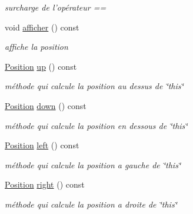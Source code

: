 \begin{DoxyCompactItemize}
\begin{DoxyCompactList}\small\item\em surcharge de l'opérateur == \end{DoxyCompactList}\item 
\hypertarget{classPosition_a93014db59c98c0f95eb2056bf546f956}{void \hyperlink{classPosition_a93014db59c98c0f95eb2056bf546f956}{afficher} () const }\label{classPosition_a93014db59c98c0f95eb2056bf546f956}

\begin{DoxyCompactList}\small\item\em affiche la position \end{DoxyCompactList}\item 
\hypertarget{classPosition_a429c01611d2b0d7dfb06d182ad60928c}{\hyperlink{classPosition}{Position} \hyperlink{classPosition_a429c01611d2b0d7dfb06d182ad60928c}{up} () const }\label{classPosition_a429c01611d2b0d7dfb06d182ad60928c}

\begin{DoxyCompactList}\small\item\em méthode qui calcule la position au dessus de \char`\"{}this\char`\"{} \end{DoxyCompactList}\item 
\hypertarget{classPosition_a20fbdadf072a7f285e8181f339776c0c}{\hyperlink{classPosition}{Position} \hyperlink{classPosition_a20fbdadf072a7f285e8181f339776c0c}{down} () const }\label{classPosition_a20fbdadf072a7f285e8181f339776c0c}

\begin{DoxyCompactList}\small\item\em méthode qui calcule la position en dessous de \char`\"{}this\char`\"{} \end{DoxyCompactList}\item 
\hypertarget{classPosition_ad90cc325cca474c6c140b63c9bc69ddd}{\hyperlink{classPosition}{Position} \hyperlink{classPosition_ad90cc325cca474c6c140b63c9bc69ddd}{left} () const }\label{classPosition_ad90cc325cca474c6c140b63c9bc69ddd}

\begin{DoxyCompactList}\small\item\em méthode qui calcule la position a gauche de \char`\"{}this\char`\"{} \end{DoxyCompactList}\item 
\hypertarget{classPosition_a5dff15ebfa9df6de047e0268c9e29728}{\hyperlink{classPosition}{Position} \hyperlink{classPosition_a5dff15ebfa9df6de047e0268c9e29728}{right} () const }\label{classPosition_a5dff15ebfa9df6de047e0268c9e29728}

\begin{DoxyCompactList}\small\item\em méthode qui calcule la position a droite de \char`\"{}this\char`\"{} \end{DoxyCompactList}\end{DoxyCompactItemize}


